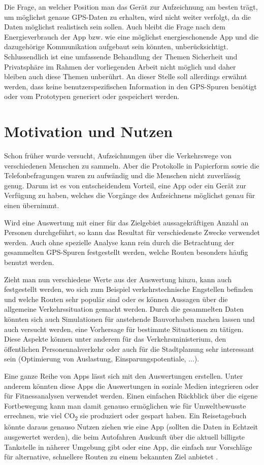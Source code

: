 Die Frage, an welcher Position man das Gerät zur Aufzeichnung am besten trägt, um möglichst genaue GPS-Daten zu erhalten, wird nicht weiter verfolgt, da die Daten möglichst realistisch sein sollen. Auch bleibt die Frage nach dem Energieverbrauch der App bzw. wie eine möglichst energieschonende App und die dazugehörige Kommunikation aufgebaut sein könnten, unberücksichtigt. Schlussendlich ist eine umfassende Behandlung der Themen Sicherheit und Privatsphäre im Rahmen der vorliegenden Arbeit nicht möglich und daher bleiben auch diese Themen unberührt. An dieser Stelle soll allerdings erwähnt werden, dass keine benutzerspezifischen Information in den GPS-Spuren benötigt oder vom Prototypen generiert oder gespeichert werden.

\section{Motivation und Nutzen}
Schon früher wurde versucht, Aufzeichnungen über die Verkehrswege von verschiedenen Menschen zu sammeln. Aber die Protokolle in Papierform sowie die Telefonbefragungen waren zu aufwändig und die Menschen nicht zuverlässig genug. Darum ist es von entscheidendem Vorteil, eine App oder ein Gerät zur Verfügung zu haben, welches die Vorgänge des Aufzeichnens möglichst genau für einen übernimmt. \cite{zheng_understanding_2010}

Wird eine Auswertung mit einer für das Zielgebiet aussagekräftigen Anzahl an Personen durchgeführt, so kann das Resultat  für verschiedenste Zwecke verwendet werden. Auch ohne spezielle Analyse kann rein durch die Betrachtung der gesammelten GPS-Spuren festgestellt werden, welche Routen besonders häufig benutzt werden.

Zieht man nun verschiedene Werte aus der Auswertung hinzu, kann auch festgestellt werden, wo sich zum Beispiel verkehrstechnische Engstellen befinden und welche Routen sehr populär sind oder es können Aussagen über die allgemeine Verkehrssituation gemacht werden. Durch die gesammelten Daten könnten sich auch Simulationen für anstehende Bauvorhaben machen lassen und auch versucht werden, eine Vorhersage für bestimmte Situationen zu tätigen. Diese Aspekte können unter anderem für das Verkehrsministerium,  den öffentlichen Personennahverkehr oder auch für die Stadtplanung sehr interessant sein (Optimierung von Auslastung, Einsparungspotentiale, ...).

Eine ganze Reihe von Apps lässt sich mit den Auswertungen erstellen. Unter anderem könnten diese Apps die Auswertungen in soziale Medien integrieren oder  für Fitnessanalysen verwendet werden. Einen einfachen Rückblick über die eigene Fortbewegung kann man damit genauso ermöglichen wie für Umweltbewusste errechnen, wie viel CO\textsubscript{2} sie produziert oder gespart haben. Ein Reisetagebuch könnte daraus genauso Nutzen ziehen wie eine App (sollten die Daten in Echtzeit ausgewertet werden), die beim Autofahren Auskunft über die aktuell billigste Tankstelle in näherer Umgebung gibt oder eine App, die einfach nur Vorschläge für alternative, schnellere Routen zu einem bekannten Ziel anbietet .

